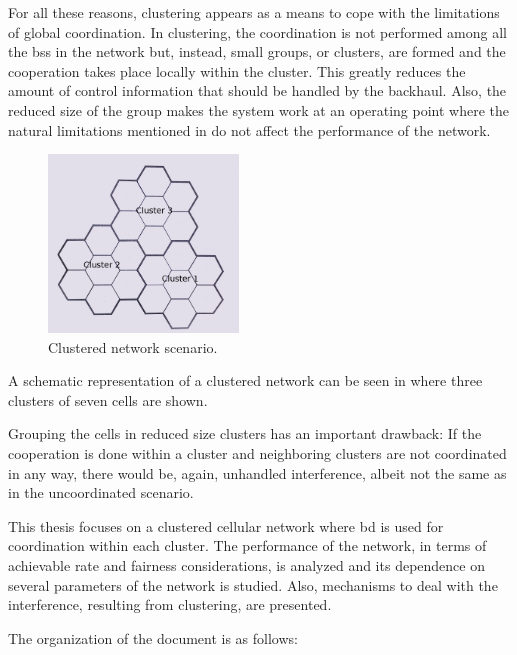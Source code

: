 For all these reasons, clustering appears as a means to cope with the
limitations of global coordination. In clustering, the coordination is not
performed among all the \glspl{bs} in the network but, instead, small groups, or
clusters, are formed and the cooperation takes place locally within the cluster.
This greatly reduces the amount of control information that should be handled by
the backhaul. Also, the reduced size of the group makes the system work at an
operating point where the natural limitations mentioned in \cite{lozano13} do
not affect the performance of the network.

\begin{figure}[t]
    \centering
    \includegraphics[width=0.45\textwidth]{./01.introduction/img/clustered_network.png}
    \caption{Clustered network scenario.}
    \label{fig:clustered_network}
\end{figure}

A schematic representation of a clustered network can be seen in
 where three clusters of seven cells are shown.

Grouping the cells in reduced size clusters has an important drawback: If the
cooperation is done within a cluster and neighboring clusters are not
coordinated in any way, there would be, again, unhandled interference, albeit
not the same as in the uncoordinated scenario.

This thesis focuses on a clustered cellular network where \gls{bd} is used for
coordination within each cluster. The performance of the network, in terms of
achievable rate and fairness considerations, is analyzed and its dependence on
several parameters of the network is studied. Also, mechanisms to deal with the
interference, resulting from clustering, are presented.

The organization of the document is as follows:

